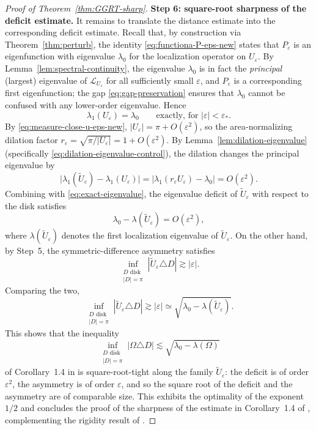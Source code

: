 \documentclass[a4paper,11pt,reqno]{amsart}
\numberwithin{equation}{section}
\theoremstyle{plain} %
\theoremstyle{definition} %
\theoremstyle{remark}
\begin{document}
\begin{proof}[Proof of Theorem~\ref{thm:GGRT-sharp}]
\medskip
\noindent
{\bf Step 6: square-root sharpness of the deficit estimate.} It remains to translate the distance estimate into the corresponding deficit
estimate. Recall that, by construction via Theorem~\ref{thm:perturb}, the
identity \eqref{eq:functiona-P-eps-new} states that \(P_\varepsilon\) is an
eigenfunction with eigenvalue \(\lambda_0\) for the localization operator on
\(U_\varepsilon\). By Lemma~\ref{lem:spectral-continuity}, the eigenvalue
\(\lambda_0\) is in fact the \emph{principal} (largest) eigenvalue of
\(\mathcal L_{U_\varepsilon}\) for all sufficiently small \(\varepsilon\),
and \(P_\varepsilon\) is a corresponding first eigenfunction; the gap
\eqref{eq:gap-preservation} ensures that \(\lambda_0\) cannot be confused
with any lower-order eigenvalue. Hence
\begin{equation}\label{eq:exact-eigenvalue}
\lambda_1(U_\varepsilon)=\lambda_0
\qquad\text{exactly, for }|\varepsilon|<\varepsilon_*.
\end{equation}
By \eqref{eq:measure-close-u-eps-new},
\(|U_\varepsilon|=\pi+O(\varepsilon^2)\), so the area-normalizing dilation
factor \(r_\varepsilon=\sqrt{\pi/|U_\varepsilon|}=1+O(\varepsilon^2)\). By
Lemma~\ref{lem:dilation-eigenvalue}
(specifically \eqref{eq:dilation-eigenvalue-control}), the dilation changes
the principal eigenvalue by
\[
\bigl|\lambda_1(\widetilde U_\varepsilon)-\lambda_1(U_\varepsilon)\bigr|
=
\bigl|\lambda_1(r_\varepsilon U_\varepsilon)-\lambda_0\bigr|
=
O(\varepsilon^2).
\]
Combining with \eqref{eq:exact-eigenvalue}, the eigenvalue deficit of
\(\widetilde U_\varepsilon\) with respect to the disk satisfies
\[
\lambda_0-\lambda(\widetilde U_\varepsilon)=O(\varepsilon^2),
\]
where \(\lambda(\widetilde U_\varepsilon)\) denotes the first localization
eigenvalue of \(\widetilde U_\varepsilon\). On the other hand, by Step~5,
the symmetric-difference asymmetry satisfies
\[
\inf_{\substack{D\text{ disk}\\ |D|=\pi}}|\widetilde U_\varepsilon\triangle D|
\gtrsim |\varepsilon|.
\]
Comparing the two,
\[
\inf_{\substack{D\text{ disk}\\ |D|=\pi}}|\widetilde U_\varepsilon\triangle D|
\gtrsim |\varepsilon|
\simeq
\sqrt{\lambda_0-\lambda(\widetilde U_\varepsilon)}.
\]
This shows that the inequality
\[
\inf_{\substack{D\text{ disk}\\ |D|=\pi}}
|\Omega\triangle D|
\lesssim
\sqrt{\lambda_0-\lambda(\Omega)}
\]
of Corollary~1.4 in \cite{Gomez-Guerra-Ramos-Tilli} is square-root-tight along
the family \(\widetilde U_\varepsilon\): the deficit is of order
\(\varepsilon^2\), the asymmetry is of order \(\varepsilon\), and so the
square root of the deficit and the asymmetry are of comparable size. This
exhibits the optimality of the exponent \(1/2\) and concludes the proof of the
sharpness of the estimate in Corollary~1.4 of
\cite{Gomez-Guerra-Ramos-Tilli}, complementing the rigidity result of
\cite{Nicola-Tilli}.

\end{proof}
\end{document}

